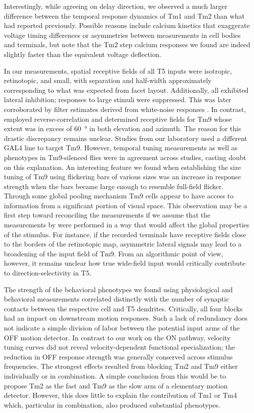 Interestingly, while agreeing on delay direction, we observed a much larger difference between the temporal response dynamics of Tm1 and Tm2 than what \citet{Behnia:2014jh} had reported previously. Possible reasons include calcium kinetics that exaggerate voltage timing differences or asymmetries between measurements in cell bodies and terminals, but note that the Tm2 step calcium responses we found are indeed slightly faster than the equivalent voltage deflection.

In our measurements, spatial receptive fields of all T5 inputs were isotropic, retinotopic, and small, with separation and half-width approximately corresponding to what was expected from facet layout. Additionally, all exhibited lateral inhibition; responses to large stimuli were suppressed. This was later corroborated by filter estimates derived from white-noise responses \citep{Arenz:2017aa}. In contrast, \citet{Fisher:2015aa} employed reverse-correlation and determined receptive fields for Tm9 whose extent was in excess of \SI{60}{\degree} in both elevation and azimuth. The reason for this drastic discrepancy remains unclear. Studies from our laboratory used a different GAL4 line to target Tm9. However, temporal tuning measurements as well as phenotypes in Tm9-silenced flies were in agreement across studies, casting doubt on this explanation. An interesting feature we found when establishing the size tuning of Tm9 using flickering bars of various sizes was an increase in response strength when the bars became large enough to resemble full-field flicker. Through some global pooling mechanism Tm9 cells appear to have access to information from a significant portion of visual space. This observation may be a first step toward reconciling the measurements if we assume that the measurements by \citeauthor{Fisher:2015aa} were performed in a way that would affect the global properties of the stimulus. For instance, if the recorded terminals have receptive fields close to the borders of the retinotopic map, asymmetric lateral signals may lead to a broadening of the input field of Tm9. From an algorithmic point of view, however, it remains unclear how true wide-field input would critically contribute to direction-selectivity in T5.

The strength of the behavioral phenotypes we found using physiological and behavioral measurements correlated distinctly with the number of synaptic contacts between the respective cell and T5 dendrites. Critically, all four blocks had an impact on downstream motion responses. Such a lack of redundancy does not indicate a simple division of labor between the potential input arms of the OFF motion detector. In contrast to our work on the ON pathway, velocity tuning curves did not reveal velocity-dependent functional specialization; the reduction in OFF response strength was generally conserved across stimulus frequencies. The strongest effects resulted from blocking Tm2 and Tm9 either individually or in combination. A simple conclusion from this would be to propose Tm2 as the fast and Tm9 as the slow arm of a elementary motion detector. However, this does little to explain the contribution of Tm1 or Tm4 which, particular in combination, also produced substantial phenotypes.


